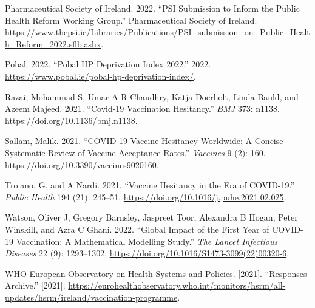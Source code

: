 \documentclass{article}
\newlength{\cslhangindent}
\newenvironment{CSLReferences}[2] %
 {\begin{list}{}{%
  \setlength{\itemindent}{0pt}
  \setlength{\leftmargin}{0pt}
  \setlength{\parsep}{0pt}
  \ifodd #1
   \setlength{\leftmargin}{\cslhangindent}
   \setlength{\itemindent}{-1\cslhangindent}
  \fi
  \setlength{\itemsep}{#2\baselineskip}}}
 {\end{list}}
\begin{document}
\begin{CSLReferences}{1}{0}
Pharmaceutical Society of Ireland. 2022. {``{PSI} Submission to Inform
the Public Health Reform Working Group.''} Pharmaceutical Society of
Ireland.
\url{https://www.thepsi.ie/Libraries/Publications/PSI_submission_on_Public_Health_Reform_2022.sflb.ashx}.

Pobal. 2022. {``Pobal {HP} {Deprivation} {Index} 2022.''} 2022.
\url{https://www.pobal.ie/pobal-hp-deprivation-index/}.

Razai, Mohammad S, Umar A R Chaudhry, Katja Doerholt, Linda Bauld, and
Azeem Majeed. 2021. {``Covid-19 Vaccination Hesitancy.''} \emph{BMJ}
373: n1138. \url{https://doi.org/10.1136/bmj.n1138}.

Sallam, Malik. 2021. {``COVID-19 Vaccine Hesitancy Worldwide: A Concise
Systematic Review of Vaccine Acceptance Rates.''} \emph{Vaccines} 9 (2):
160. \url{https://doi.org/10.3390/vaccines9020160}.

Troiano, G, and A Nardi. 2021. {``Vaccine Hesitancy in the Era of
COVID-19.''} \emph{Public Health} 194 (21): 245--51.
\url{https://doi.org/10.1016/j.puhe.2021.02.025}.

Watson, Oliver J, Gregory Barnsley, Jaspreet Toor, Alexandra B Hogan,
Peter Winskill, and Azra C Ghani. 2022. {``Global Impact of the First
Year of COVID-19 Vaccination: A Mathematical Modelling Study.''}
\emph{The Lancet Infectious Diseases} 22 (9): 1293--1302.
\url{https://doi.org/10.1016/S1473-3099(22)00320-6}.

WHO European Observatory on Health Systems and Policies. {[}2021{]}.
{``Responses Archive.''} {[}2021{]}.
\url{https://eurohealthobservatory.who.int/monitors/hsrm/all-updates/hsrm/ireland/vaccination-programme}.

\end{CSLReferences}



\end{document}
